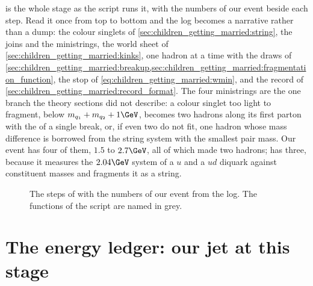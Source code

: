  is the whole stage as the script
runs it, with the numbers of our event beside each step. Read it once from
top to bottom and the  log becomes a narrative rather than a dump:
the colour singlets of \cref{sec:children_getting_married:string}, the
joins and the ministrings, the world sheet of
\cref{sec:children_getting_married:kinks}, one hadron at a time with the
draws of \cref{sec:children_getting_married:breakup,sec:children_getting_married:fragmentation_function},
the stop of \cref{eq:children_getting_married:wmin}, and the record of
\cref{sec:children_getting_married:record_format}. The four ministrings
are the one branch the theory sections did not describe: a colour singlet
too light to fragment, below $m_{q_1}+m_{q_2}+1\GeV$, becomes two hadrons
along its first parton with the \pt of a single break, or, if even two do
not fit, one hadron whose mass difference is borrowed from the string
system with the smallest pair mass. Our event has four of them, $1.5$ to
$2.7\GeV$, all of which made two hadrons; \PYTHIA has three, because it
measures the $2.04\GeV$ system of a $u$ and a $ud$ diquark against
constituent masses and fragments it as a string.

\begin{figure}[htbp]\centering
\resizebox{\textwidth}{!}{}
\caption[The hadronisation stage as a flow chart]{The steps of
 with the numbers of our event from the
 log. The functions of the script are named in grey.}
\label{fig:children_getting_married:flow}
\end{figure}

\section{The energy ledger: our jet at this stage}
\label{sec:children_getting_married:our_jet_at_this_stage_the_hadron_level_f}

